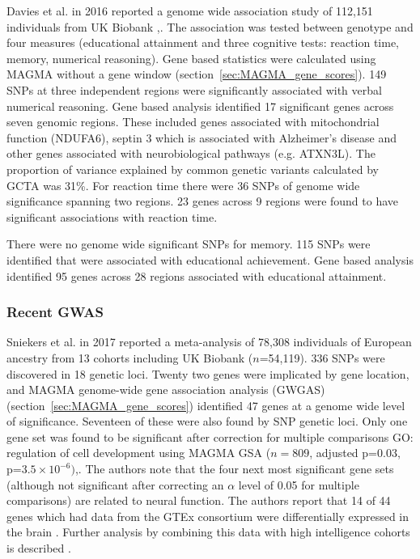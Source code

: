 Davies et al.\cite{davies2016genome} in 2016 reported a genome wide association study of 112,151 individuals from UK Biobank \cite{bycroft2018uk},\cite{elliott2008uk}. The association was tested between genotype and four measures (educational attainment and three cognitive tests: reaction time, memory, numerical reasoning). Gene
based statistics were calculated using MAGMA without a gene window
\cite{de2015magma}(section~\ref{sec:MAGMA_gene_scores}). 149 SNPs at three independent regions were significantly associated with verbal numerical reasoning. Gene based analysis identified 17 significant genes across seven genomic regions. These included genes associated with mitochondrial function (NDUFA6), septin 3 which is associated with Alzheimer's disease and other genes associated with neurobiological pathways (e.g. ATXN3L). The proportion of variance explained by common genetic variants calculated by GCTA was 31\%.
For reaction time there were 36 SNPs of genome wide significance spanning two regions. 23 genes across 9 regions were found to have significant associations with reaction time. 

There were no genome wide significant SNPs for memory. 115 SNPs were identified that were associated with educational achievement. Gene based analysis identified 95 genes across 28 regions associated with educational attainment.

\subsubsection{Recent GWAS}
\label{sec:intelligence intro recent gwas}
Sniekers et al.\cite{sniekers2017genome} in 2017 reported a meta-analysis of 78,308 individuals of European ancestry from 13 cohorts including UK Biobank ($n$=54,119). 336 SNPs were discovered in 18 genetic loci. Twenty two genes were implicated by gene location, and MAGMA genome-wide gene association analysis (GWGAS)  (section~\ref{sec:MAGMA_gene_scores}) identified 47 genes at a genome wide level of significance. Seventeen of these were also found by SNP genetic loci. Only one gene set was found to be significant after correction for multiple comparisons GO: regulation of cell development using MAGMA GSA ($n=809$, adjusted p=0.03, p=$3.5 \times 10^{-6})$\cite{de2015magma},\cite{sniekers2017genome}. The authors note that the four next most significant gene sets (although not significant after correcting an $\alpha$ level of 0.05 for multiple comparisons) are related to neural function. The authors report that 14 of 44 genes which had data from the GTEx consortium were differentially expressed in the brain \cite{gtex2015genotype}. Further analysis by combining this data with high intelligence cohorts is described \cite{coleman2019biological}.

